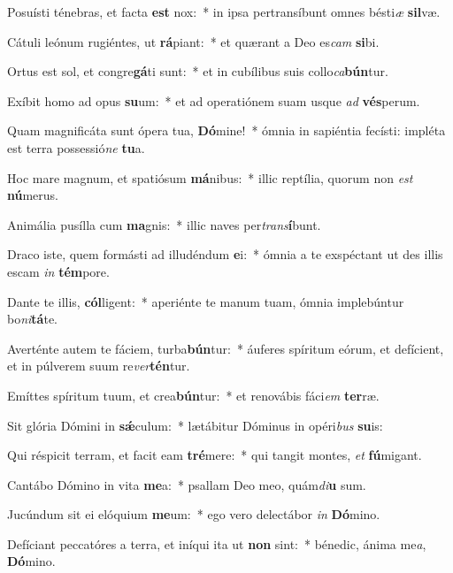 \item Posuísti ténebras, et facta \textbf{est} nox:~* in ipsa pertransíbunt omnes bésti\textit{æ} \textbf{sil}væ.
\item Cátuli leónum rugiéntes, ut \textbf{rá}piant:~* et quærant a Deo es\textit{cam} \textbf{si}bi.
\item Ortus est sol, et congre\textbf{gá}ti sunt:~* et in cubílibus suis collo\textit{ca}\textbf{bún}tur.
\item Exíbit homo ad opus \textbf{su}um:~* et ad operatiónem suam usque \textit{ad} \textbf{vés}perum.
\item Quam magnificáta sunt ópera tua, \textbf{Dó}mine!~* ómnia in sapiéntia fecísti: impléta est terra possessió\textit{ne} \textbf{tu}a.
\item Hoc mare magnum, et spatiósum \textbf{má}nibus:~* illic reptília, quorum non \textit{est} \textbf{nú}merus.
\item Animália pusílla cum \textbf{ma}gnis:~* illic naves per\textit{trans}\textbf{í}bunt.
\item Draco iste, quem formásti ad illudéndum \textbf{e}i:~* ómnia a te exspéctant ut des illis escam \textit{in} \textbf{tém}pore.
\item Dante te illis, \textbf{cól}ligent:~* aperiénte te manum tuam, ómnia implebúntur bo\textit{ni}\textbf{tá}te.
\item Averténte autem te fáciem, turba\textbf{bún}tur:~* áuferes spíritum eórum, et defícient, et in púlverem suum re\textit{ver}\textbf{tén}tur.
\item Emíttes spíritum tuum, et crea\textbf{bún}tur:~* et renovábis fáci\textit{em} \textbf{ter}ræ.
\item Sit glória Dómini in \textbf{sǽ}culum:~* lætábitur Dóminus in opéri\textit{bus} \textbf{su}is:
\item Qui réspicit terram, et facit eam \textbf{tré}mere:~* qui tangit montes, \textit{et} \textbf{fú}migant.
\item Cantábo Dómino in vita \textbf{me}a:~* psallam Deo meo, quám\textit{di}\textbf{u} sum.
\item Jucúndum sit ei elóquium \textbf{me}um:~* ego vero delectábor \textit{in} \textbf{Dó}mino.
\item Defíciant peccatóres a terra, et iníqui ita ut \textbf{non} sint:~* bénedic, ánima me\textit{a}, \textbf{Dó}mino.
